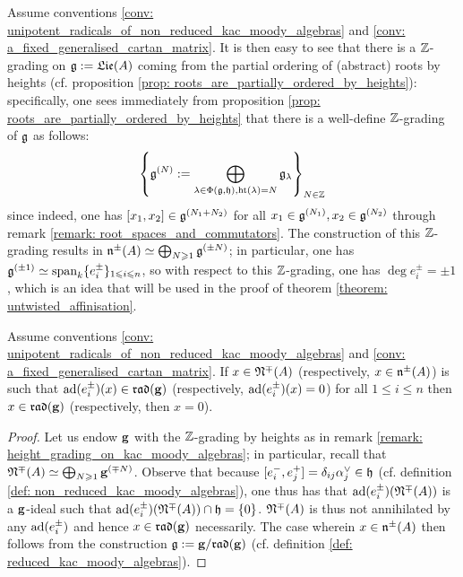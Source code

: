             \begin{remark} \label{remark: height_grading_on_kac_moody_algebras}
                Assume conventions \ref{conv: unipotent_radicals_of_non_reduced_kac_moody_algebras} and \ref{conv: a_fixed_generalised_cartan_matrix}. It is then easy to see that there is a $\mathbb{Z}$-grading on $\mathfrak{g} := \mathfrak{Lie}(A)$ coming from the partial ordering of (abstract) roots by heights (cf. proposition \ref{prop: roots_are_partially_ordered_by_heights}): specifically, one sees immediately from proposition \ref{prop: roots_are_partially_ordered_by_heights} that there is a well-define $\mathbb{Z}$-grading of $\mathfrak{g}$ as follows:
                    $$\left\{ \mathfrak{g}^{(N)} := \bigoplus_{\lambda \in \Phi(\mathfrak{g}, \mathfrak{h}), \operatorname{ht}(\lambda) = N} \mathfrak{g}_{\lambda} \right\}_{N \in \mathbb{Z}}$$
                since indeed, one has $[x_1, x_2] \in \mathfrak{g}^{(N_1 + N_2)}$ for all $x_1 \in \mathfrak{g}^{(N_1)}, x_2 \in \mathfrak{g}^{(N_2)}$ through remark \ref{remark: root_spaces_and_commutators}. The construction of this $\mathbb{Z}$-grading results in $\mathfrak{n}^{\pm}(A) \simeq \bigoplus_{N \geqslant 1} \mathfrak{g}^{(\pm N)}$; in particular, one has $\mathfrak{g}^{(\pm 1)} \simeq \operatorname{span}_k \{e_i^{\pm}\}_{1 \leqslant i \leqslant n}$, so with respect to this $\mathbb{Z}$-grading, one has $\deg e_i^{\pm} = \pm 1$, which is an idea that will be used in the proof of theorem \ref{theorem: untwisted_affinisation}.
            \end{remark}
            \begin{lemma} \label{lemma: commutator_of_the_negative_and_positive_unipotent_radicals}
                \cite[Lemma 1.5]{kac_infinite_dimensional_lie_algebras} Assume conventions \ref{conv: unipotent_radicals_of_non_reduced_kac_moody_algebras} and \ref{conv: a_fixed_generalised_cartan_matrix}. If $x \in \mathfrak{N}^{\mp}(A)$ (respectively, $x \in \mathfrak{n}^{\pm}(A)$) is such that $\mathrm{ad}(e_i^{\pm})(x) \in \mathfrak{rad}(\mathbf{g})$ (respectively, $\mathrm{ad}(e_i^{\pm})(x) = 0$) for all $1 \leq i \leq n$ then $x \in \mathfrak{rad}(\mathbf{g})$ (respectively, then $x = 0$). 
            \end{lemma}
                \begin{proof}
                    Let us endow $\mathbf{g}$ with the $\mathbb{Z}$-grading by heights as in remark \ref{remark: height_grading_on_kac_moody_algebras}; in particular, recall that $\mathfrak{N}^{\mp}(A) \simeq \bigoplus_{N \geqslant 1} \mathbf{g}^{(\mp N)}$. Observe that because $[e_i^-, e_j^+] = \delta_{ij} \alpha_j^{\vee} \in \mathfrak{h}$ (cf. definition \ref{def: non_reduced_kac_moody_algebras}), one thus has that $\mathrm{ad}(e_i^{\pm})(\mathfrak{N}^{\mp}(A))$ is a $\mathbf{g}$-ideal such that $\mathrm{ad}(e_i^{\pm})(\mathfrak{N}^{\mp}(A)) \cap \mathfrak{h} = \{0\}$. $\mathfrak{N}^{\mp}(A)$ is thus not annihilated by any $\mathrm{ad}(e_i^{\pm})$ and hence $x \in \mathfrak{rad}(\mathbf{g})$ necessarily. The case wherein $x \in \mathfrak{n}^{\pm}(A)$ then follows from the construction $\mathfrak{g} := \mathbf{g}/\mathfrak{rad}(\mathbf{g})$ (cf. definition \ref{def: reduced_kac_moody_algebras}).
                \end{proof}
